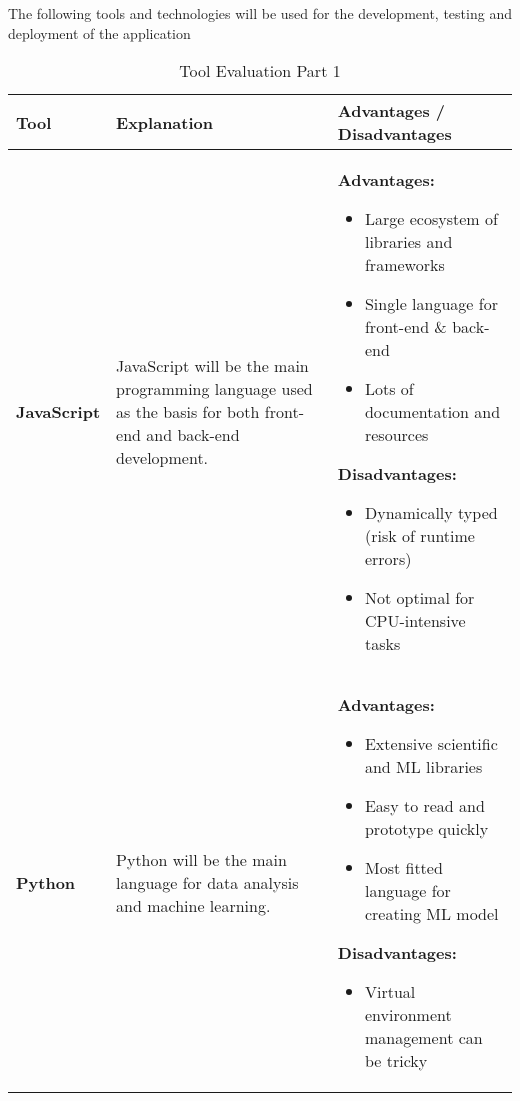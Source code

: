 \documentclass{article}
\begin{document}
The following tools and technologies will be used for the development, testing and deployment of the application 

\begin{table}[htbp]
  \caption{Tool Evaluation Part 1}
  \label{TblToolEval}
  \renewcommand{\arraystretch}{1.2}   %
  \setlength{\tabcolsep}{5pt}         %
  \begin{tabularx}{\textwidth}{p{2cm} p{4cm} X}
  \toprule
  \textbf{Tool} & \textbf{Explanation} & \textbf{Advantages / Disadvantages}\\
  \midrule

  \textbf{JavaScript} 
  & JavaScript will be the main programming language used as the basis for both front-end and back-end development.
  & \textbf{Advantages:}
    \begin{itemize}
      \item Large ecosystem of libraries and frameworks
      \item Single language for front-end \& back-end
      \item Lots of documentation and resources 
    \end{itemize}
    \textbf{Disadvantages:}
    \begin{itemize}
      \item Dynamically typed (risk of runtime errors)
      \item Not optimal for CPU-intensive tasks
    \end{itemize}
  \\
  \midrule

  \textbf{Python} 
  & Python will be the main language for data analysis and machine learning.
  & \textbf{Advantages:}
    \begin{itemize}
      \item Extensive scientific and ML libraries
      \item Easy to read and prototype quickly
      \item Most fitted language for creating ML model
    \end{itemize}
    \textbf{Disadvantages:}
    \begin{itemize}
      \item Virtual environment management can be tricky
    \end{itemize}
  \\
  \midrule


\end{tabularx}
\end{table}
\end{document}
